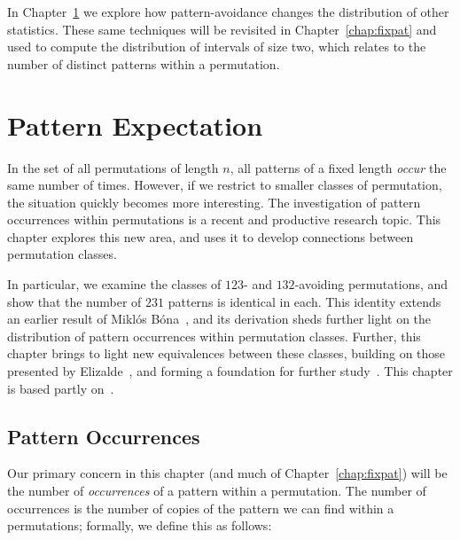 \documentclass[12pt,twoside]{memoir}
\begin{document}
      In Chapter~\ref{chap:expat} we explore how pattern-avoidance changes the
      distribution of other statistics. These same techniques will be revisited
      in Chapter~\ref{chap:fixpat} and used to compute the distribution of
      intervals of size two, which relates to the number of distinct patterns
      within a permutation. 



\cleardoublepage
\typeout{******************}
\typeout{******************}

\chapter{Pattern Expectation}
  \label{chap:expat}
    

    
    In the set of all permutations of length $n$, all patterns of a fixed length 
    \emph{occur} the same number of times. However, if we restrict to smaller
    classes of permutation, the situation quickly becomes more interesting.  The
    investigation of pattern occurrences within permutations is a recent and
    productive research topic. This chapter explores this new area, and uses it
    to develop connections between permutation classes. 
    
    
    In particular, we examine the classes of $123$- and $132$-avoiding
    permutations, and show that the number of $231$ patterns is identical in each.
    This identity extends an earlier result of Mikl\'os B\'ona~\cite{Bona2012},
    and its derivation sheds further light on the distribution of pattern
    occurrences within permutation classes. Further, this chapter brings to light
    new equivalences between these classes, building on those presented by
    Elizalde~\cite{sergithesis}, and forming a foundation for
    further study~\cite{Elizalde2013, Rudolph2013, Janson2014}.  This chapter is
    based partly on~\cite{me-expat}.

    

    


  \section{Pattern Occurrences}
  \label{expat:occurrences}
    
    Our primary concern in this chapter (and much of Chapter~\ref{chap:fixpat})
    will be the number of \emph{occurrences} of a pattern within a permutation.
    The number of occurrences is the number of copies of the pattern we can
    find within a permutations; formally, we define this as follows: 
    
\end{document}
